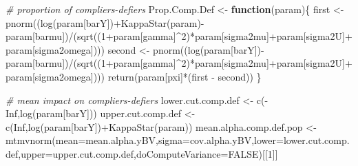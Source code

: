 \documentclass[
]{book}
\newenvironment{Shaded}{\begin{snugshade}}{\end{snugshade}}
\newcommand{\AttributeTok}[1]{\textcolor[rgb]{0.77,0.63,0.00}{#1}}
\newcommand{\CommentTok}[1]{\textcolor[rgb]{0.56,0.35,0.01}{\textit{#1}}}
\newcommand{\ConstantTok}[1]{\textcolor[rgb]{0.00,0.00,0.00}{#1}}
\newcommand{\ControlFlowTok}[1]{\textcolor[rgb]{0.13,0.29,0.53}{\textbf{#1}}}
\newcommand{\DecValTok}[1]{\textcolor[rgb]{0.00,0.00,0.81}{#1}}
\newcommand{\FunctionTok}[1]{\textcolor[rgb]{0.00,0.00,0.00}{#1}}
\newcommand{\NormalTok}[1]{#1}
\newcommand{\OtherTok}[1]{\textcolor[rgb]{0.56,0.35,0.01}{#1}}
\newcommand{\SpecialCharTok}[1]{\textcolor[rgb]{0.00,0.00,0.00}{#1}}
\newcommand{\StringTok}[1]{\textcolor[rgb]{0.31,0.60,0.02}{#1}}
\theoremstyle{definition}
\theoremstyle{definition}
\theoremstyle{definition}
\theoremstyle{definition}
\theoremstyle{remark}
\begin{document}
\begin{Shaded}
\begin{Highlighting}[]
\CommentTok{\# proportion of compliers{-}defiers}
\NormalTok{Prop.Comp.Def }\OtherTok{\textless{}{-}} \ControlFlowTok{function}\NormalTok{(param)\{}
\NormalTok{  first }\OtherTok{\textless{}{-}} \FunctionTok{pnorm}\NormalTok{((}\FunctionTok{log}\NormalTok{(param[}\StringTok{\textquotesingle{}barY\textquotesingle{}}\NormalTok{])}\SpecialCharTok{+}\FunctionTok{KappaStar}\NormalTok{(param)}\SpecialCharTok{{-}}\NormalTok{param[}\StringTok{\textquotesingle{}barmu\textquotesingle{}}\NormalTok{])}\SpecialCharTok{/}\NormalTok{(}\FunctionTok{sqrt}\NormalTok{((}\DecValTok{1}\SpecialCharTok{+}\NormalTok{param[}\StringTok{\textquotesingle{}gamma\textquotesingle{}}\NormalTok{]}\SpecialCharTok{\^{}}\DecValTok{2}\NormalTok{)}\SpecialCharTok{*}\NormalTok{param[}\StringTok{\textquotesingle{}sigma2mu\textquotesingle{}}\NormalTok{]}\SpecialCharTok{+}\NormalTok{param[}\StringTok{\textquotesingle{}sigma2U\textquotesingle{}}\NormalTok{]}\SpecialCharTok{+}\NormalTok{param[}\StringTok{\textquotesingle{}sigma2omega\textquotesingle{}}\NormalTok{])))}
\NormalTok{  second }\OtherTok{\textless{}{-}} \FunctionTok{pnorm}\NormalTok{((}\FunctionTok{log}\NormalTok{(param[}\StringTok{\textquotesingle{}barY\textquotesingle{}}\NormalTok{])}\SpecialCharTok{{-}}\NormalTok{param[}\StringTok{\textquotesingle{}barmu\textquotesingle{}}\NormalTok{])}\SpecialCharTok{/}\NormalTok{(}\FunctionTok{sqrt}\NormalTok{((}\DecValTok{1}\SpecialCharTok{+}\NormalTok{param[}\StringTok{\textquotesingle{}gamma\textquotesingle{}}\NormalTok{]}\SpecialCharTok{\^{}}\DecValTok{2}\NormalTok{)}\SpecialCharTok{*}\NormalTok{param[}\StringTok{\textquotesingle{}sigma2mu\textquotesingle{}}\NormalTok{]}\SpecialCharTok{+}\NormalTok{param[}\StringTok{\textquotesingle{}sigma2U\textquotesingle{}}\NormalTok{]}\SpecialCharTok{+}\NormalTok{param[}\StringTok{\textquotesingle{}sigma2omega\textquotesingle{}}\NormalTok{])))}
  \FunctionTok{return}\NormalTok{(param[}\StringTok{\textquotesingle{}pxi\textquotesingle{}}\NormalTok{]}\SpecialCharTok{*}\NormalTok{(first }\SpecialCharTok{{-}}\NormalTok{ second))  }
\NormalTok{\}}

\CommentTok{\# mean impact on compliers{-}defiers}
\NormalTok{lower.cut.comp.def }\OtherTok{\textless{}{-}} \FunctionTok{c}\NormalTok{(}\SpecialCharTok{{-}}\ConstantTok{Inf}\NormalTok{,}\FunctionTok{log}\NormalTok{(param[}\StringTok{\textquotesingle{}barY\textquotesingle{}}\NormalTok{]))}
\NormalTok{upper.cut.comp.def }\OtherTok{\textless{}{-}} \FunctionTok{c}\NormalTok{(}\ConstantTok{Inf}\NormalTok{,}\FunctionTok{log}\NormalTok{(param[}\StringTok{\textquotesingle{}barY\textquotesingle{}}\NormalTok{])}\SpecialCharTok{+}\FunctionTok{KappaStar}\NormalTok{(param))}
\NormalTok{mean.alpha.comp.def.pop }\OtherTok{\textless{}{-}} \FunctionTok{mtmvnorm}\NormalTok{(}\AttributeTok{mean=}\NormalTok{mean.alpha.yBV,}\AttributeTok{sigma=}\NormalTok{cov.alpha.yBV,}\AttributeTok{lower=}\NormalTok{lower.cut.comp.def,}\AttributeTok{upper=}\NormalTok{upper.cut.comp.def,}\AttributeTok{doComputeVariance=}\ConstantTok{FALSE}\NormalTok{)[[}\DecValTok{1}\NormalTok{]]}


\end{Highlighting}
\end{Shaded}
\end{document}
